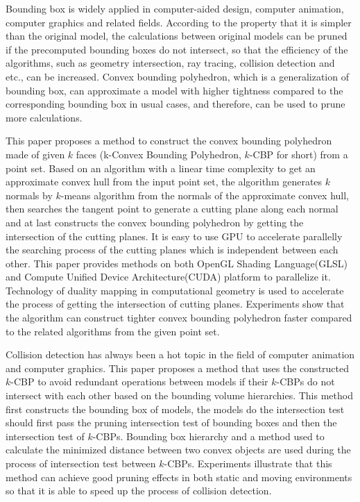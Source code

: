 \begin{eabstract} 
Bounding box is widely applied in computer-aided design, computer animation, computer graphics and related fields. 
According to the property that it is simpler than the original model, the calculations between original models can be pruned if the precomputed bounding boxes do not intersect, so that the efficiency of the algorithms, such as geometry intersection, ray tracing, collision detection and etc., can be increased.
Convex bounding polyhedron, which is a generalization of bounding box,  can approximate a model with higher tightness compared to the corresponding bounding box in usual cases, and therefore, can be used to prune more calculations.

This paper proposes a method to construct the convex bounding polyhedron made of given $k$ faces (k-Convex Bounding Polyhedron, $k$-CBP for short) from a point set.
Based on an algorithm with a linear time complexity to get an approximate convex hull from the input point set, 
the algorithm generates $k$ normals by $k$-means algorithm from the normals of the approximate convex hull,  
then searches the tangent point to generate a cutting plane along each normal and at last constructs the convex bounding polyhedron by getting the intersection of the cutting planes. 
It is easy to use GPU to accelerate parallelly the searching process of the cutting planes which is independent between each other. 
This paper provides methods on both OpenGL Shading Language(GLSL) and Compute Unified Device Architecture(CUDA) platform to parallelize it. 
Technology of duality mapping in computational geometry is used to accelerate the process of getting the intersection of cutting planes. 
Experiments show that the algorithm can construct tighter convex bounding polyhedron faster compared to the related algorithms from the given point set.

Collision detection has always been a hot topic in the field of computer animation and computer graphics. 
This paper proposes a method that uses the constructed $k$-CBP to avoid redundant operations between models if their $k$-CBPs do not intersect with each other based on the bounding volume hierarchies.
This method first constructs the bounding box of models, the models do the intersection test should first pass the pruning intersection test of bounding boxes and then the intersection test of $k$-CBPs. 
Bounding box hierarchy and a method used to calculate the minimized distance between two convex objects are used during the process of intersection test between $k$-CBPs. 
Experiments illustrate that this method can achieve good pruning effects in both static and moving environments so that it is able to speed up the process of collision detection.

\end{eabstract}


